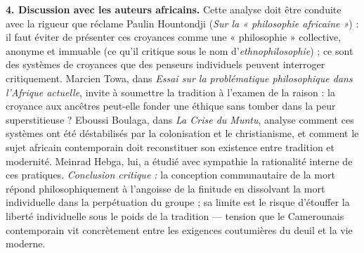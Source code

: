 \documentclass[11pt]{article}
\begin{document}
\begin{corrige}
\textbf{4. Discussion avec les auteurs africains.} Cette analyse doit être conduite avec la rigueur que réclame Paulin Hountondji (\emph{Sur la « philosophie africaine »}) : il faut éviter de présenter ces croyances comme une « philosophie » collective, anonyme et immuable (ce qu'il critique sous le nom d'\emph{ethnophilosophie}) ; ce sont des systèmes de croyances que des penseurs individuels peuvent interroger critique­ment. Marcien Towa, dans \emph{Essai sur la problématique philosophique dans l'Afrique actuelle}, invite à soumettre la tradition à l'examen de la raison : la croyance aux ancêtres peut-elle fonder une éthique sans tomber dans la peur superstitieuse ? Eboussi Boulaga, dans \emph{La Crise du Muntu}, analyse comment ces systèmes ont été déstabilisés par la colonisation et le christianisme, et comment le sujet africain contemporain doit reconstituer son existence entre tradition et modernité. Meinrad Hebga, lui, a étudié avec sympathie la rationalité interne de ces pratiques. \emph{Conclusion critique :} la conception communautaire de la mort répond philosophiquement à l'angoisse de la finitude en dissolvant la mort individuelle dans la perpétuation du groupe ; sa limite est le risque d'étouffer la liberté individuelle sous le poids de la tradition — tension que le Camerounais contemporain vit concrètement entre les exigences coutumières du deuil et la vie moderne.
\end{corrige}
\end{document}
